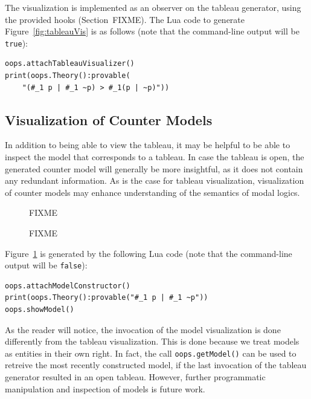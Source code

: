 The visualization is implemented as an observer on the tableau generator,
using the provided hooks (Section~FIXME). The Lua code to generate
Figure~\ref{fig:tableauVis} is as follows (note that the command-line output
will be \lstinline!true!):
\begin{lstlisting}
oops.attachTableauVisualizer()
print(oops.Theory():provable(
	"(#_1 p | #_1 ~p) > #_1(p | ~p)"))
\end{lstlisting}

\subsection{Visualization of Counter Models}

In addition to being able to view the tableau, it may be helpful to be able to
inspect the model that corresponds to a tableau. In case the tableau is open,
the generated counter model will generally be more insightful, as it does not
contain any redundant information. As is the case for tableau visualization,
visualization of counter models may enhance understanding of the semantics of
modal logics.

\begin{figure}
\centering
FIXME
\caption{FIXME}
\label{fig:modelVis}
\end{figure}

Figure~\ref{fig:modelVis} is generated by the following Lua code (note that
the command-line output will be \lstinline!false!):
\begin{lstlisting}
oops.attachModelConstructor()
print(oops.Theory():provable("#_1 p | #_1 ~p"))
oops.showModel() 
\end{lstlisting}
As the reader will notice, the invocation of the model visualization is done
differently from the tableau visualization. This is done because we treat
models as entities in their own right. In fact, the call
\lstinline!oops.getModel()!  can be used to retreive the most recently
constructed model, if the last invocation of the tableau generator resulted in
an open tableau. However, further programmatic manipulation and inspection of
models is future work.
